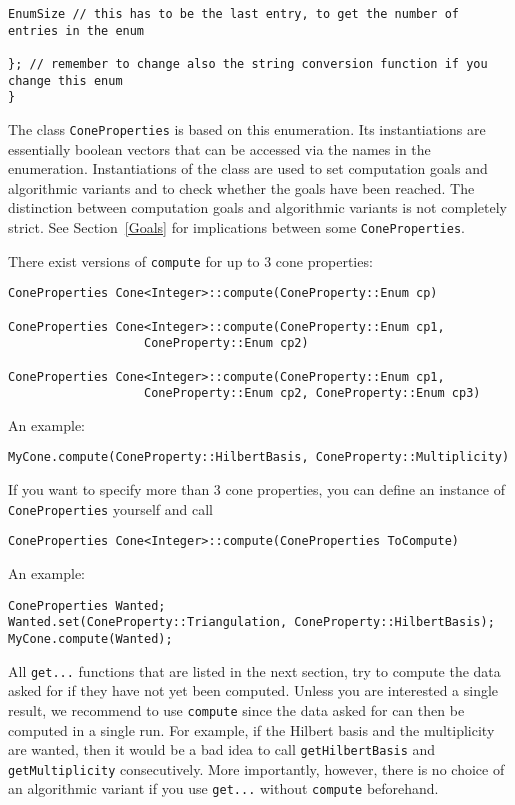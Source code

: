 \documentclass[12pt,a4paper]{scrartcl}
\theoremstyle{definition}
\begin{document}
\begin{small}
\begin{Verbatim}
EnumSize // this has to be the last entry, to get the number of entries in the enum

}; // remember to change also the string conversion function if you change this enum
}
\end{Verbatim}

The class \verb|ConeProperties| is based on this enumeration. Its instantiations are essentially boolean vectors that can be accessed via the names in the enumeration. Instantiations of the class are used to set computation goals and algorithmic variants and to check whether the goals have been reached. The distinction between computation goals and algorithmic variants is not completely strict. See Section~\ref{Goals} for implications between some \verb|ConeProperties|.

There exist versions of \verb|compute| for up to $3$ cone properties:
\begin{Verbatim}
ConeProperties Cone<Integer>::compute(ConeProperty::Enum cp)

ConeProperties Cone<Integer>::compute(ConeProperty::Enum cp1, 
                   ConeProperty::Enum cp2)

ConeProperties Cone<Integer>::compute(ConeProperty::Enum cp1, 
                   ConeProperty::Enum cp2, ConeProperty::Enum cp3)
\end{Verbatim}

An example:
\begin{Verbatim}
MyCone.compute(ConeProperty::HilbertBasis, ConeProperty::Multiplicity)
\end{Verbatim}

If you want to specify more than $3$ cone properties, you can define an instance of \verb|ConeProperties| yourself and call
\begin{Verbatim}
ConeProperties Cone<Integer>::compute(ConeProperties ToCompute)
\end{Verbatim}

An example:
\begin{Verbatim}
ConeProperties Wanted;
Wanted.set(ConeProperty::Triangulation, ConeProperty::HilbertBasis);
MyCone.compute(Wanted);
\end{Verbatim}

All \verb|get...| functions that are listed in the next section, try to compute the data asked for if they have not yet been computed. Unless you are interested a single result, we recommend to use \verb|compute| since the data asked for can then be computed in a single run. For example, if the Hilbert basis and the multiplicity are wanted, then it would be a bad idea to call \verb|getHilbertBasis| and \verb|getMultiplicity| consecutively. More importantly, however, there is no choice of an algorithmic variant if you use \verb|get...| without \verb|compute| beforehand.


\end{small}
\end{document}
